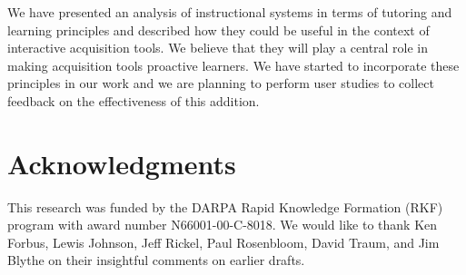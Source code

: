\documentclass{llncs}
\begin{document}
We have presented an analysis of instructional systems in terms of tutoring
and learning principles and described how they could be useful in the context
of interactive acquisition tools.  We believe that they will play a central
role in making acquisition tools proactive learners.  We have started to
incorporate these principles in our work and we are planning to perform user
studies to collect feedback on the effectiveness of this addition.

\section*{Acknowledgments}

This research was funded by the DARPA Rapid Knowledge Formation (RKF) program
with award number N66001-00-C-8018.  We would like to thank Ken Forbus, Lewis
Johnson, Jeff Rickel, Paul Rosenbloom, David Traum, and Jim Blythe on their
insightful comments on earlier drafts.
\end{document}
